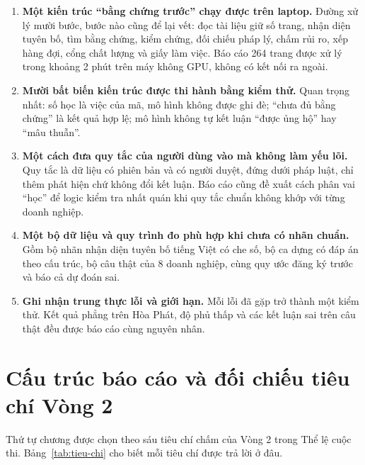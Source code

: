 \begin{enumerate}
\item \textbf{Một kiến trúc “bằng chứng trước” chạy được trên laptop.} Đường xử lý mười bước, bước nào cũng để lại vết: đọc tài liệu giữ số trang, nhận diện tuyên bố, tìm bằng chứng, kiểm chứng, đối chiếu pháp lý, chấm rủi ro, xếp hàng đợi, cổng chất lượng và giấy làm việc. Báo cáo 264 trang được xử lý trong khoảng 2 phút trên máy không GPU, không có kết nối ra ngoài.
\item \textbf{Mười bất biến kiến trúc được thi hành bằng kiểm thử.} Quan trọng nhất: số học là việc của mã, mô hình không được ghi đè; “chưa đủ bằng chứng” là kết quả hợp lệ; mô hình không tự kết luận “được ủng hộ” hay “mâu thuẫn”.
\item \textbf{Một cách đưa quy tắc của người dùng vào mà không làm yếu lõi.} Quy tắc là dữ liệu có phiên bản và có người duyệt, đứng dưới pháp luật, chỉ thêm phát hiện chứ không đổi kết luận. Báo cáo cũng đề xuất cách phân vai “học” để logic kiểm tra nhất quán khi quy tắc chuẩn không khớp với từng doanh nghiệp.
\item \textbf{Một bộ dữ liệu và quy trình đo phù hợp khi chưa có nhãn chuẩn.} Gồm bộ nhãn nhận diện tuyên bố tiếng Việt có che số, bộ ca dựng có đáp án theo cấu trúc, bộ câu thật của 8 doanh nghiệp, cùng quy ước đăng ký trước và báo cả dự đoán sai.
\item \textbf{Ghi nhận trung thực lỗi và giới hạn.} Mỗi lỗi đã gặp trở thành một kiểm thử. Kết quả phẳng trên Hòa Phát, độ phủ thấp và các kết luận sai trên câu thật đều được báo cáo cùng nguyên nhân.
\end{enumerate}

\section{Cấu trúc báo cáo và đối chiếu tiêu chí Vòng 2}

Thứ tự chương được chọn theo sáu tiêu chí chấm của Vòng 2 trong Thể lệ cuộc thi. Bảng~\ref{tab:tieu-chi} cho biết mỗi tiêu chí được trả lời ở đâu.

